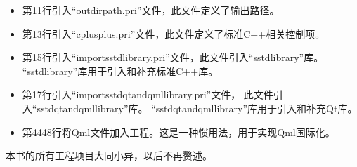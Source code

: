 \begin{itemize}
\item 第11行引入“outdirpath.pri”文件，此文件定义了输出路径。
\item 第13行引入“cplusplus.pri”文件，此文件定义了标准C{\sourcefonttwo{}+}{\sourcefonttwo{}+}相关控制项。
\item 第15行引入“import\underline{\hspace{0.5em}}sstd\underline{\hspace{0.5em}}library.pri”文件，此文件引入“sstd\underline{\hspace{0.5em}}library”库。
“sstd\underline{\hspace{0.5em}}library”库用于引入和补充标准C{\sourcefonttwo{}+}{\sourcefonttwo{}+}库。
\item 第17行引入“import\underline{\hspace{0.5em}}sstd\underline{\hspace{0.5em}}qt\underline{\hspace{0.5em}}and\underline{\hspace{0.5em}}qml\underline{\hspace{0.5em}}library.pri”文件，
此文件引入“sstd\underline{\hspace{0.5em}}qt\underline{\hspace{0.5em}}and\underline{\hspace{0.5em}}qml\underline{\hspace{0.5em}}library”库。
“sstd\underline{\hspace{0.5em}}qt\underline{\hspace{0.5em}}and\underline{\hspace{0.5em}}qml\underline{\hspace{0.5em}}library”库用于引入和补充Qt库。
\item 第44\raisebox{0.16ex}{\sourcefonttwo\~{}}48行将Qml文件加入工程。这是一种惯用法，用于实现Qml国际化。
\end{itemize}

本书的所有工程项目大同小异，以后不再赘述。

